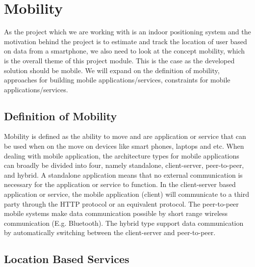 \section{Mobility}
As the project which we are working with is an indoor positioning system and the motivation behind the project is to estimate and track the location of user based on data from a smartphone, we also need to look at the concept mobility, which is the overall theme of this project module. This is the case as the developed solution should be mobile. We will expand on the definition of mobility, approaches for building mobile applications/services, constraints for mobile applications/services. 

\subsection{Definition of Mobility}
Mobility is defined as the ability to move and are application or service that can be used when on the move on devices like smart phones, laptops and etc. When dealing with mobile application, the architecture types for mobile applications can broadly be divided into four, namely standalone, client-server, peer-to-peer, and hybrid. A standalone application means that no external communication is necessary for the application or service to function. In the client-server based application or service, the mobile application (client) will communicate to a third party through the HTTP protocol or an equivalent protocol. The peer-to-peer mobile systems make data communication possible by short range wireless communication (E.g. Bluetooth). The hybrid type support data communication by automatically switching between the client-server and peer-to-peer.

\subsection{Location Based Services}


